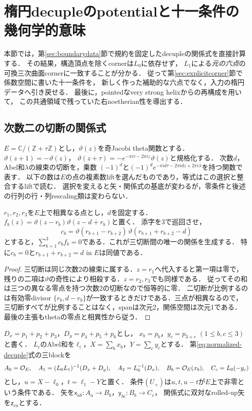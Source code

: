 \section{楕円decupleのpotentialと十一条件の幾何学的意味}\label{sec:ellipticcoefficients}
本節では，第\ref{sec:boundarydata}節で規約を固定したdecupleの関係式を直接計算する．
その結果，構造頂点を除くcornerは$L_0$に依存せず，
$L_1$による\emph{元の六点}の可換三次曲面cornerに一致することが分かる．
従って第\ref{sec:explicitcorner}節で係数空間に書いた十一条件を，
新しく作った補助的な六点でなく，入力の楕円データへ引き戻せる．
最後に，pointedなvery strong helixからの再構成を用いて，
この共通領域で残っていた右noetherian性を導出する．

\subsection{次数二の切断の関係式}
$E=\mathbb C/(\mathbb Z+\tau\mathbb Z)$とし，$\vartheta(z)$を奇Jacobi theta関数とする．
$\vartheta(z+1)=-\vartheta(z)$，
$\vartheta(z+\tau)=-e^{-\pi i\tau-2\pi iz}\vartheta(z)$と規格化する．
次数$d$，Abel和$\lambda$の線束の切断を，乗数
$(-1)^d$と$(-1)^de^{-\pi id\tau-2\pi idz+2\pi i\lambda}$を持つ関数で表す．
以下の数は$E$の点の複素数liftを選んだものであり，等式はこの選択と整合するliftで読む．
選択を変えると矢・関係式の基底が変わるが，零条件と後述の行列の行・列rescaling類は変わらない．

\begin{lemma}\label{lem:theta-relation}
$r_1,r_2,r_3$を$E$上で相異なる点とし，$d$を固定する．
$f_b(z)=\vartheta(z-r_b)\vartheta(z-d+r_b)$と置く．
添字を$3$で巡回させ，
\[
 c_b=\vartheta(r_{b+1}-r_{b+2})\,
       \vartheta(r_{b+1}+r_{b+2}-d)
\]
とすると，$\sum_{b=1}^3 c_bf_b=0$である．これが三切断間の唯一の関係を生成する．
特に$c_b=0$と$r_{b+1}+r_{b+2}=d$ in $E$は同値である．
\end{lemma}
\begin{proof}
三切断は同じ次数2の線束に属する．$z=r_1$へ代入すると第一項は零で，
残りの二項は$\vartheta$の奇性により相殺する．$z=r_2,r_3$でも同様である．
従ってその和は三つの異なる零点を持つ次数2の切断なので恒等的に零．
二切断が比例するのは有効零divisor
$\{r_b,d-r_b\}$が一致するときだけである．三点が相異なるので，
三切断すべてが比例することはなく，spanは次元2，関係空間は次元1である．
最後の主張もthetaの零点と相異性から従う．
\end{proof}

$D_x=p_1+p_2+p_3$，$D_y=p_4+p_5+p_6$とし，
$x_b=p_b$，$y_c=p_{3+c}$ $(1\le b,c\le3)$と書く．
$L_i$のAbel和を$\ell_i$，$X=\sum_bx_b$，$Y=\sum_cy_c$とする．
第\ref{eq:normalized-decuple}式の三blockを
\[
 A_0=\mathcal O_E,\quad A_1=(L_0L_1)^{-1}(D_x+D_y),\quad
 A_2=L_0^{-1}(D_x),\quad
 B_b=\mathcal O_E(x_b),\quad C_c=L_0(-y_c)
\]
とし，$u=X-\ell_0$，$t=\ell_1-Y$と置く．
条件$(U_+)$は$u,t,u-t$が$E$上で非零という条件である．
矢を$\mathsf x_{ab}:A_a\to B_b$，$\mathsf y_{bc}:B_b\to C_c$，
関係式に双対なrolled-up矢を$\mathsf z_{ca}$とする．

